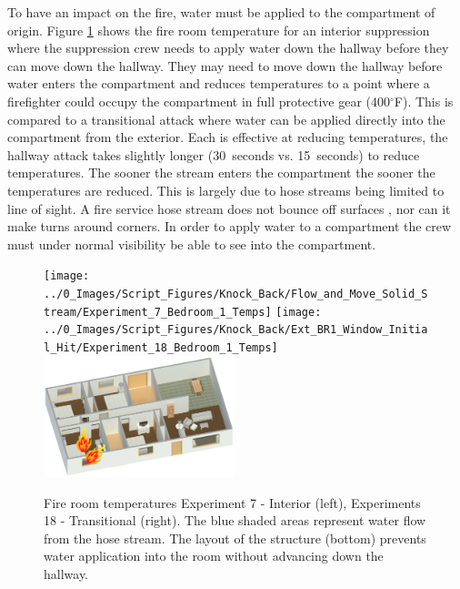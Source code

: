 \documentclass[12pt,oneside]{book}
\begin{document}
To have an impact on the fire, water must be applied to the compartment of origin. Figure \ref{fig:water_app_dir_TC_temp_reduce} shows the fire room temperature for an interior suppression where the suppression crew needs to apply water down the hallway before they can move down the hallway. They may need to move down the hallway before water enters the compartment and reduces temperatures to a point where a firefighter could occupy the compartment in full protective gear (400$^\circ$F). This is compared to a transitional attack where water can be applied directly into the compartment from the exterior. Each is effective at reducing temperatures, the hallway attack takes slightly longer (30~seconds vs. 15~seconds) to reduce temperatures. The sooner the stream enters the compartment the sooner the temperatures are reduced. This is largely due to hose streams being limited to line of sight. A fire service hose stream does not bounce off surfaces \cite{Weinchenk_watermapping}, nor can it make turns around corners. In order to apply water to a compartment the crew must under normal visibility be able to see into the compartment. 

\begin{figure}[H]
\centering
\texttt{[image: ../0\_Images/Script\_Figures/Knock\_Back/Flow\_and\_Move\_Solid\_Stream/Experiment\_7\_Bedroom\_1\_Temps]}
\texttt{[image: ../0\_Images/Script\_Figures/Knock\_Back/Ext\_BR1\_Window\_Initial\_Hit/Experiment\_18\_Bedroom\_1\_Temps]}
\includegraphics[width=0.495\textwidth]{../0_Images/Tactical_Considerations/Water_In_Compartment/ISO_Bed1_Fire}
\caption[Window vs. Hallway Water Application - Single Room Fire, Window Vent]{Fire room temperatures Experiment 7 - Interior (left), Experiments 18 - Transitional (right). The blue shaded areas represent water flow from the hose stream. The layout of the structure (bottom) prevents water application into the room without advancing down the hallway.}
\label{fig:water_app_dir_TC_temp_reduce}
\end{figure}
\end{document}
